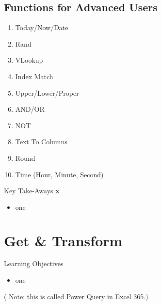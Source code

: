 \subsection{Functions for Advanced Users}

\begin{enumerate}
	\item Today/Now/Date
	\item Rand
	\item VLookup
	\item Index Match
	\item Upper/Lower/Proper
	\item AND/OR
	\item NOT
	\item Text To Columns
	\item Round
	\item Time (Hour, Minute, Second)
\end{enumerate}

\begin{center}
	\begin{tkwbox}{Key Take-Aways}
		\textbf{x}
		\\
		\begin{itemize}
			\setlength{\itemsep}{0pt}
			\setlength{\parskip}{0pt}
			\setlength{\parsep}{0pt}
			
			\item one
			
		\end{itemize}
	\end{tkwbox}
\end{center}

\section{Get \& Transform}

\begin{center}
	\begin{objbox}{Learning Objectives}
		\begin{itemize}
			\setlength{\itemsep}{0pt}
			\setlength{\parskip}{0pt}
			\setlength{\parsep}{0pt}
			
			\item one
			
		\end{itemize}
	\end{objbox}
\end{center}

( Note: this is called Power Query in Excel 365.)

